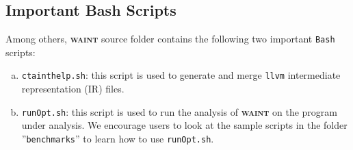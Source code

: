 \documentclass[12pt,onecolumn,a4paper]{article}
\newcommand{\waint}{\textsc{\textbf{waint}}\xspace}
\newcommand{\tool}[1]{\texttt{#1}\xspace}
\begin{document}
\subsection{Important Bash Scripts}
Among others, \waint source folder contains the following two important
\texttt{Bash} scripts:
\begin{enumerate}[a)]
	\item \texttt{ctainthelp.sh}: this script is used to generate and
		merge \tool{llvm} intermediate representation (IR) files. 
	
	\item \texttt{runOpt.sh}: this script is used to run the analysis of
		\waint on the program under analysis. We encourage users to look
		at the sample scripts in the folder ''\texttt{benchmarks}'' to
		learn how to use \texttt{runOpt.sh}.
\end{enumerate}




\end{document}
